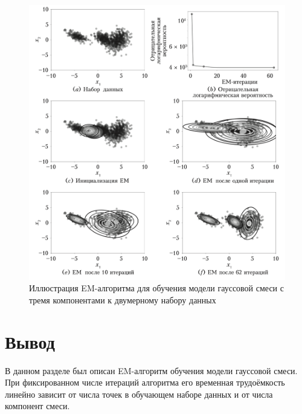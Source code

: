 \begin{figure}[H]
	\centering
	\includegraphics[width=\textwidth]{assets/em.png}
	\caption{Иллюстрация EM-алгоритма для обучения модели гауссовой смеси с тремя компонентами к двумерному набору данных}
	\label{fig:em}
\end{figure}



\section{Вывод}

В данном разделе был описан EM-алгоритм обучения модели гауссовой смеси. При фиксированном числе итераций алгоритма его временная трудоёмкость линейно зависит от числа точек в обучающем наборе данных и от числа компонент смеси.

